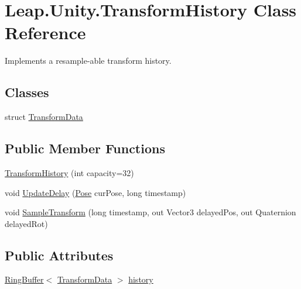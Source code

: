 \hypertarget{class_leap_1_1_unity_1_1_transform_history}{}\section{Leap.\+Unity.\+Transform\+History Class Reference}
\label{class_leap_1_1_unity_1_1_transform_history}


Implements a resample-\/able transform history.  


\subsection*{Classes}
\begin{DoxyCompactItemize}
\item 
struct \mbox{\hyperlink{struct_leap_1_1_unity_1_1_transform_history_1_1_transform_data}{Transform\+Data}}
\end{DoxyCompactItemize}
\subsection*{Public Member Functions}
\begin{DoxyCompactItemize}
\item 
\mbox{\hyperlink{class_leap_1_1_unity_1_1_transform_history_afde8bfc49828526da6fa6460346f8304}{Transform\+History}} (int capacity=32)
\item 
void \mbox{\hyperlink{class_leap_1_1_unity_1_1_transform_history_a831ac5fe8ef56cd29bb8bce038cac019}{Update\+Delay}} (\mbox{\hyperlink{struct_leap_1_1_unity_1_1_pose}{Pose}} cur\+Pose, long timestamp)
\item 
void \mbox{\hyperlink{class_leap_1_1_unity_1_1_transform_history_a027228e6fa5c86fb1c42c0afbc465b04}{Sample\+Transform}} (long timestamp, out Vector3 delayed\+Pos, out Quaternion delayed\+Rot)
\end{DoxyCompactItemize}
\subsection*{Public Attributes}
\begin{DoxyCompactItemize}
\item 
\mbox{\hyperlink{class_leap_1_1_unity_1_1_ring_buffer}{Ring\+Buffer}}$<$ \mbox{\hyperlink{struct_leap_1_1_unity_1_1_transform_history_1_1_transform_data}{Transform\+Data}} $>$ \mbox{\hyperlink{class_leap_1_1_unity_1_1_transform_history_a5d822021ea5550a45bd559d7567ae2ed}{history}}
\end{DoxyCompactItemize}


